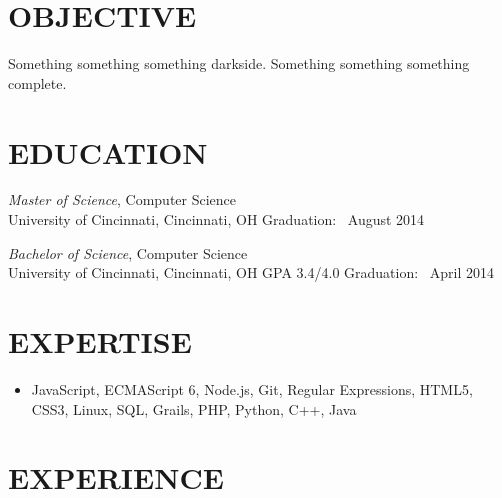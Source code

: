 \documentclass[11pt, line]{res}
\begin{document}
	\address{
			8228 Melrose Ln\\ Maineville, OH 45039\\ (513) 259-0656\\ ross@rhadden.com
	}

	\begin{resume}
		\section{OBJECTIVE}
			Something something something darkside.  Something something something complete.

		\section{EDUCATION}
			\textit{Master of Science},
				Computer Science \\
				University of Cincinnati, Cincinnati, OH
				\hfill
					Graduation: \ August 2014

			\textit{Bachelor of Science},
				Computer Science \\
				University of Cincinnati, Cincinnati, OH
				\hspace{0.2in}
					GPA 3.4/4.0
				\hfill
					Graduation: \ April 2014

		\section{EXPERTISE}
			\begin{itemize}
				\item[]
					JavaScript,
					ECMAScript 6,
					Node.js,
					Git,
					Regular Expressions,
					HTML5,
					CSS3,
					Linux,
					SQL,
					Grails,
					PHP,
					Python,
					C++,
					Java
			\end{itemize}

		\section{EXPERIENCE}
	\end{resume}
\end{document}
